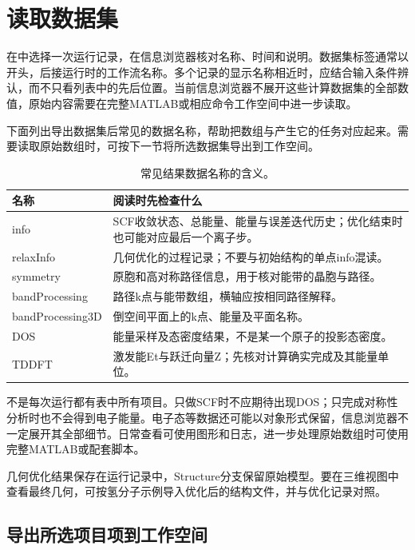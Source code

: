 \section{读取数据集}\label{sec:read-dataset}

在中选择一次运行记录，在信息浏览器核对名称、时间和说明。数据集标签通常以开头，后接运行时的工作流名称。多个记录的显示名称相近时，应结合输入条件辨认，而不只看列表中的先后位置。当前信息浏览器不展开这些计算数据集的全部数值，原始内容需要在完整MATLAB\regmark{}或相应命令工作空间中进一步读取。

下面列出导出数据集后常见的数据名称，帮助把数组与产生它的任务对应起来。需要读取原始数组时，可按下一节将所选数据集导出到工作空间。

\begin{table}[htbp]
\centering
\caption{常见结果数据名称的含义。}
\begin{tabularx}{\linewidth}{lX}
\toprule
名称 & 阅读时先检查什么 \\
\midrule
info & SCF收敛状态、总能量、能量与误差迭代历史；优化结束时也可能对应最后一个离子步。 \\
relaxInfo & 几何优化的过程记录；不要与初始结构的单点info混读。 \\
symmetry & 原胞和高对称路径信息，用于核对能带的晶胞与路径。 \\
bandProcessing & 路径k点与能带数组，横轴应按相同路径解释。 \\
bandProcessing3D & 倒空间平面上的k点、能量及平面名称。 \\
DOS & 能量采样及态密度结果，不是某一个原子的投影态密度。 \\
TDDFT & 激发能Et与跃迁向量Z；先核对计算确实完成及其能量单位。 \\
\bottomrule
\end{tabularx}
\end{table}

不是每次运行都有表中所有项目。只做SCF时不应期待出现DOS；只完成对称性分析时也不会得到电子能量。电子态等数据还可能以对象形式保留，信息浏览器不一定展开其全部细节。日常查看可使用图形和日志，进一步处理原始数组时可使用完整MATLAB\regmark{}或配套脚本。

几何优化结果保存在运行记录中，Structure分支保留原始模型。要在三维视图中查看最终几何，可按氢分子示例导入优化后的结构文件，并与优化记录对照。

\subsection{导出所选项目项到工作空间}

